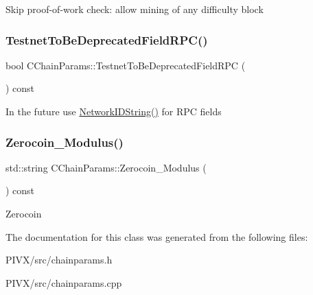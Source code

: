 Skip proof-\/of-\/work check\+: allow mining of any difficulty block \mbox{\label{class_c_chain_params_a1552cea0636112ef84069cd6b7858b8e}} 
\subsubsection{\texorpdfstring{Testnet\+To\+Be\+Deprecated\+Field\+R\+P\+C()}{TestnetToBeDeprecatedFieldRPC()}}
{\footnotesize\ttfamily bool C\+Chain\+Params\+::\+Testnet\+To\+Be\+Deprecated\+Field\+R\+PC (\begin{DoxyParamCaption}{ }\end{DoxyParamCaption}) const\hspace{0.3cm}{\ttfamily [inline]}}

In the future use \mbox{\hyperlink{class_c_chain_params_a2c02cc73f7fe9369cee9a39a0fd5b710}{Network\+I\+D\+String()}} for R\+PC fields \mbox{\label{class_c_chain_params_af6003afc48876c16e825f589eed0ff11}} 
\subsubsection{\texorpdfstring{Zerocoin\+\_\+\+Modulus()}{Zerocoin\_Modulus()}}
{\footnotesize\ttfamily std\+::string C\+Chain\+Params\+::\+Zerocoin\+\_\+\+Modulus (\begin{DoxyParamCaption}{ }\end{DoxyParamCaption}) const\hspace{0.3cm}{\ttfamily [inline]}}

Zerocoin 

The documentation for this class was generated from the following files\+:\begin{DoxyCompactItemize}
\item 
P\+I\+V\+X/src/chainparams.\+h\item 
P\+I\+V\+X/src/chainparams.\+cpp\end{DoxyCompactItemize}

